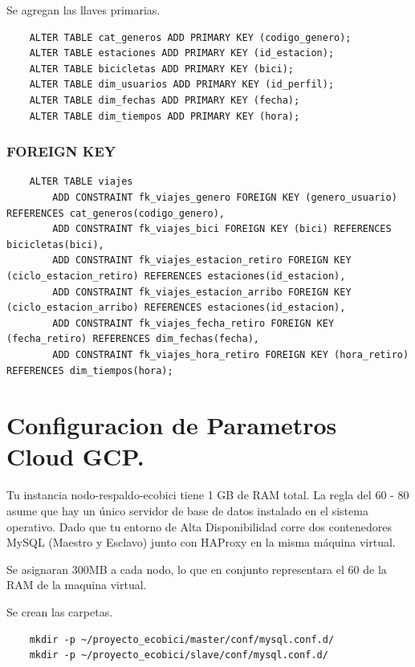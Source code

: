\documentclass[10pt,a4paper]{article}
\begin{document}
Se agregan las llaves primarias.

\begin{lstlisting}
    ALTER TABLE cat_generos ADD PRIMARY KEY (codigo_genero);
    ALTER TABLE estaciones ADD PRIMARY KEY (id_estacion);
    ALTER TABLE bicicletas ADD PRIMARY KEY (bici);
    ALTER TABLE dim_usuarios ADD PRIMARY KEY (id_perfil);
    ALTER TABLE dim_fechas ADD PRIMARY KEY (fecha);
    ALTER TABLE dim_tiempos ADD PRIMARY KEY (hora);
\end{lstlisting}

\subsubsection{FOREIGN KEY}
\begin{lstlisting}
    ALTER TABLE viajes
        ADD CONSTRAINT fk_viajes_genero FOREIGN KEY (genero_usuario) REFERENCES cat_generos(codigo_genero),
        ADD CONSTRAINT fk_viajes_bici FOREIGN KEY (bici) REFERENCES bicicletas(bici),
        ADD CONSTRAINT fk_viajes_estacion_retiro FOREIGN KEY (ciclo_estacion_retiro) REFERENCES estaciones(id_estacion),
        ADD CONSTRAINT fk_viajes_estacion_arribo FOREIGN KEY (ciclo_estacion_arribo) REFERENCES estaciones(id_estacion),
        ADD CONSTRAINT fk_viajes_fecha_retiro FOREIGN KEY (fecha_retiro) REFERENCES dim_fechas(fecha),
        ADD CONSTRAINT fk_viajes_hora_retiro FOREIGN KEY (hora_retiro) REFERENCES dim_tiempos(hora);
\end{lstlisting}

\section{Configuracion de Parametros Cloud GCP.}
Tu instancia nodo-respaldo-ecobici tiene 1 GB de RAM total. 
La regla del 60 - 80 asume que hay un único servidor de base de datos instalado en el sistema operativo. 
Dado que tu entorno de Alta Disponibilidad corre dos contenedores MySQL (Maestro y Esclavo) 
junto con HAProxy en la misma máquina virtual.

Se asignaran 300MB a cada nodo, lo que en conjunto representara el 60 de la RAM de la maquina virtual.

Se crean las carpetas.


\begin{lstlisting}
    mkdir -p ~/proyecto_ecobici/master/conf/mysql.conf.d/
    mkdir -p ~/proyecto_ecobici/slave/conf/mysql.conf.d/
\end{lstlisting}
\end{document}
